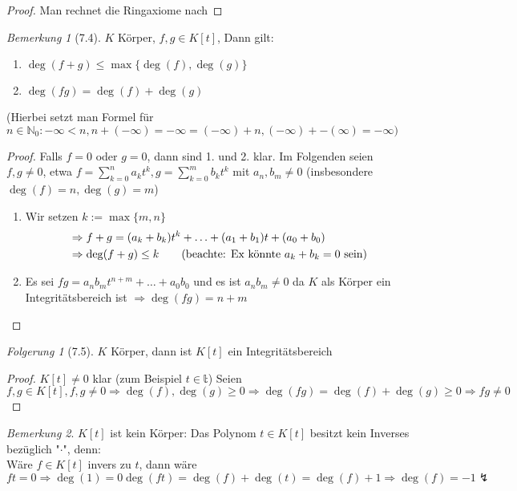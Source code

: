 \documentclass[a4paper]{scrartcl}
\theoremstyle{definition}
\theoremstyle{plain}
\theoremstyle{plain}
\theoremstyle{remark}
\newtheorem{remark}{Bemerkung}
\theoremstyle{remark}
\newtheorem{conc}{Folgerung}
\theoremstyle{remark}
\begin{document}
\begin{proof}
Man rechnet die Ringaxiome nach
\end{proof}
\begin{remark}[7.4]
\label{remark:74}
$K$ Körper, $f,g\in K[t]$, Dann gilt:
\begin{enumerate}
\item $\deg(f + g) \leq \max\{\deg(f),\deg(g)\}$
\item $\deg(f g) = \deg(f) + \deg(g)$
\end{enumerate}
(Hierbei setzt man Formel für $n\in\mathbb{N}_0: -\infty < n, n + (-\infty) = -\infty = (-\infty) + n, (-\infty) + -(\infty) = -\infty)$
\end{remark}
\begin{proof}
Falls $f = 0$ oder $g = 0$, dann sind 1. und 2. klar. Im Folgenden seien $f,g\neq 0$, etwa $f = \sum_{k = 0}^n a_k t^k, g = \sum_{k =0}^m b_k t^k$ mit $a_n, b_m \neq 0$ (insbesondere $\deg(f) = n, \deg(g) = m$)
\begin{enumerate}
\item Wir setzen $k:= \max\{m,n\}$
\begin{align*}
&\Rightarrow f + g = (a_k + b_k)t^k + \ldots + (a_1 + b_1)t + (a_0 + b_0) \\
&\Rightarrow \deg(f + g) \leq k \tag{\text{beachte: Ex könnte $a_k + b_k = 0$ sein}}
\end{align*}
\item Es sei $f g = a_n b_m t^{n + m} + \ldots + a_0 b_0$ und es ist $a_n b_m \neq 0$ da $K$ als Körper ein Integritätsbereich ist $\Rightarrow \deg(f g) = n + m$
\end{enumerate}
\end{proof}
\begin{conc}[7.5]
$K$ Körper, dann ist $K[t]$ ein Integritätsbereich
\end{conc}
\begin{proof}
$K[t] \neq 0$ klar (zum Beispiel $t\in\mathbb{t}$)
Seien $f,g\in K[t], f,g\neq 0 \Rightarrow \deg(f),\deg(g) \geq 0 \Rightarrow \deg(f g) = \deg(f) + \deg(g) \geq 0 \Rightarrow f g \neq 0$
\end{proof}
\begin{remark}
$K[t]$ ist kein Körper: Das Polynom $t\in K[t]$ besitzt kein Inverses bezüglich "$\cdot$", denn: \\
  Wäre $f\in K[t]$ invers zu $t$, dann wäre $f t = 0 \Rightarrow \deg(1) = 0 \deg(f t) = \deg(f) + \deg(t) = \deg (f) + 1 \Rightarrow \deg(f) = -1 \lightning$
\end{remark}
\end{document}
